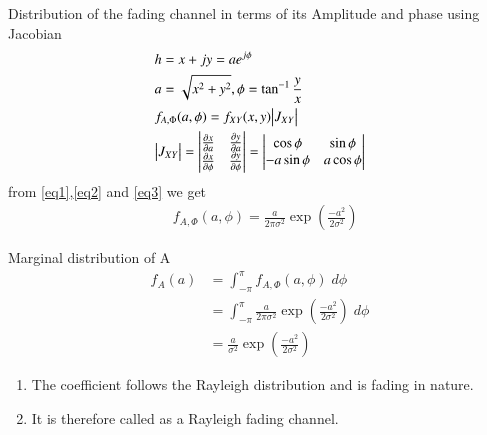 \documentclass{beamer}
\begin{document}
\begin{frame}{}

\begin{block}{ Distribution of the fading channel in terms of its Amplitude and phase using Jacobian }
\begin{align}
&h=x+jy=ae^{j\phi}\\
&a=\sqrt{x^2+y^2}, \phi=\tan^{-1}{\frac{y}{x}}\label{eq2}\\
&f_{A,{\Phi}}(a,\phi)=f_{XY}(x,y)\big{|}J_{XY}\big{|}\\
&\big{|}J_{XY}\big{|} =
\begin{vmatrix}
\frac{\partial x}{\partial a} & \frac{\partial y}{\partial a} \\
\frac{\partial x}{\partial \phi} & \frac{\partial y}{\partial \phi} 
\end{vmatrix}=\begin{vmatrix}
\cos{\phi} & \sin{\phi} \\
-a\sin{\phi} & a\cos{\phi} 
\end{vmatrix}\label{eq3}
\end{align}
from \eqref{eq1},\eqref{eq2} and \eqref{eq3} we get
\begin{align}
  &f_{A,{\Phi}}(a,\phi)= \frac{a}{{2\pi \sigma^2}}\exp{\left(\frac{-a^2}{2\sigma^2}\right)} 
\end{align}
\end{block}
\end{frame}
\begin{frame}{}
 \begin{block}{Marginal distribution of A}
 \begin{align}
   f_A(a)&=\int_{-\pi}^{\pi}f_{A,{\Phi}}(a,\phi)\;d\phi\\
   &= \int_{-\pi}^{\pi}\frac{a}{{2\pi \sigma^2}}\exp{\left(\frac{-a^2}{2\sigma^2}\right)}\;d\phi\\
   &=\frac{a}{\sigma^2}\exp{\left(\frac{-a^2}{2\sigma^2}\right)}
 \end{align}
 \end{block}
 \begin{enumerate}
     \item The coefficient follows the Rayleigh distribution and is fading in nature.
     \item  It is therefore called as a Rayleigh fading channel.
 \end{enumerate}
\end{frame}
\end{document}
